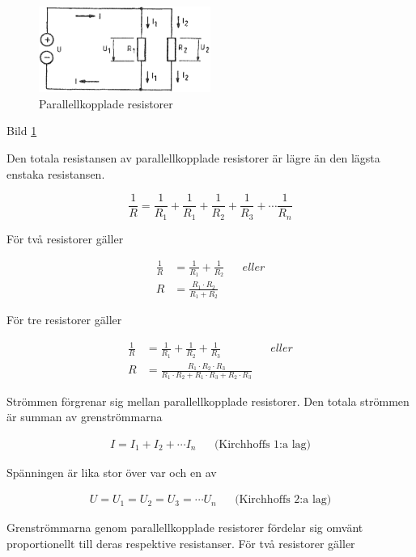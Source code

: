\begin{figure}
\includegraphics[width=0.5\textwidth]{images/cropped_pdfs/bild_2_3-02.pdf}
\caption{Parallellkopplade resistorer}
\label{fig:BildII3-02}
\end{figure}

Bild \ref{fig:BildII3-02}

Den totala resistansen av parallellkopplade resistorer är lägre än den lägsta
enstaka resistansen.

\[
\frac{1}{R} = \frac{1}{R_1} + \frac{1}{R_1} +
\frac{1}{R_2} + \frac{1}{R_3} + \cdots \frac{1}{R_n}
\]

För två resistorer gäller

\begin{align*}
\frac{1}{R} &= \frac{1}{R_1} + \frac{1}{R_2} && eller \\
R &= \frac{R_1 \cdot R_2}{R_1 + R_2}
\end{align*}

För tre resistorer gäller

\begin{align*}
\frac{1}{R} &= \frac{1}{R_1} + \frac{1}{R_2} + \frac{1}{R_3} && eller \\
R &= \frac{R_1\cdot R_2\cdot R_3}{R_1\cdot R_2 + R_1\cdot R_3 + R_2\cdot R_3}
\end{align*}

Strömmen förgrenar sig mellan parallellkopplade resistorer. Den totala strömmen
är summan av grenströmmarna

\begin{align*}
  I = I_1 + I_2 + \cdots I_n && \text{(Kirchhoffs 1:a lag)}
\end{align*}

Spänningen är lika stor över var och en av

\begin{align*}
  U = U_1 = U_2 = U_3 = \cdots U_n && \text{(Kirchhoffs 2:a lag)}
\end{align*}

Grenströmmarna genom parallellkopplade resistorer fördelar sig omvänt
proportionellt till deras respektive resistanser.
För två resistorer gäller

